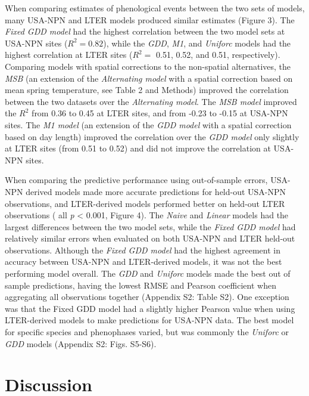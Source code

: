 \documentclass[fleqn,12pt,lineno]{article}
\begin{document}
When comparing estimates of phenological events between the two sets of models, many USA-NPN and LTER models produced similar estimates (Figure 3). The \textit{Fixed GDD model} had the highest correlation between the two model sets at USA-NPN sites ($R^2 = 0.82$), while the \textit{GDD}, \textit{M1}, and \textit{Uniforc} models had the highest correlation at LTER sites ($R^2 =$ 0.51, 0.52, and 0.51, respectively). Comparing models with spatial corrections to the non-spatial alternatives, the \textit{MSB} (an extension of the \textit{Alternating model} with a spatial correction based on mean spring temperature, see Table 2 and Methods) improved the correlation between the two datasets over the \textit{Alternating model}. The \textit{MSB model} improved the $R^2$ from 0.36 to 0.45 at LTER sites, and from -0.23 to -0.15 at USA-NPN sites. The \textit{M1 model} (an extension of the \textit{GDD model} with a spatial correction based on day length) improved the correlation over the \textit{GDD model} only slightly at LTER sites (from 0.51 to 0.52) and did not improve the correlation at USA-NPN sites. 

When comparing the predictive performance using out-of-sample errors, USA-NPN derived models made more accurate predictions for held-out USA-NPN observations, and LTER-derived models performed better on held-out LTER observations ( all \textit{p} < 0.001, Figure 4). The \textit{Naive} and \textit{Linear} models had the largest differences between the two model sets, while the \textit{Fixed GDD model} had relatively similar errors when evaluated on both USA-NPN and LTER held-out observations. Although the \textit{Fixed GDD model} had the highest agreement in accuracy between USA-NPN and LTER-derived models, it was not the best performing model overall. The \textit{GDD} and \textit{Uniforc} models made the best out of sample predictions, having the lowest RMSE and Pearson coefficient when aggregating all observations together (Appendix S2: Table S2). One exception was that the Fixed GDD model had a slightly higher Pearson value when using LTER-derived models to make predictions for USA-NPN data. The best model for specific species and phenophases varied, but was commonly the \textit{Uniforc} or \textit{GDD} models (Appendix S2: Figs. S5-S6).

\section*{Discussion}
\end{document}
